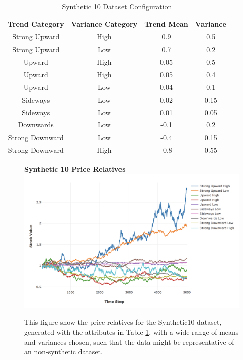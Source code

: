 \documentclass[a4paper,11pt,oneside]{article}
\theoremstyle{plain}
\theoremstyle{definition}
\begin{document}
	\begin{table}[H]
		\centering
		\small
		\begin{tabular}{|c|c|c|c|}
			\hline
			\textbf{Trend Category} &\textbf{Variance Category} & \textbf{Trend Mean} & \textbf{Variance}\\\hline	
			{Strong Upward} 		& {High} & {0.9} & {0.5} \\\hline
			{Strong Upward} 		& {Low} & {0.7} & {0.2} \\\hline
			{Upward} 					& {High} & {0.05} & {0.5} \\\hline
			{Upward} 					& {High} & {0.05} & {0.4} \\\hline
			{Upward} 					& {Low} & {0.04} & {0.1} \\\hline
			{Sideways} 					& {Low} & {0.02} & {0.15} \\\hline
			{Sideways}					& {Low} & {0.01} & {0.05} \\\hline
			{Downwards}				& {Low} & {-0.1} & {0.2} \\\hline
			{Strong Downward} 	& {Low} & {-0.4} & {0.15} \\\hline
			{Strong Downward}	& {High} & {-0.8} & {0.55} \\\hline
		\end{tabular}
		\newline\newline
		\caption{Synthetic 10 Dataset Configuration}\label{tab_synth10}
	\end{table}
	
	\begin{figure}[H]
		\centering
		\textbf{Synthetic 10 Price Relatives}
		\includegraphics[scale=0.35]{images/results/prices/synthetic10_prices.png} 
		\caption[Synthetic 10 Price Relatives]{This figure show the price relatives for the Synthetic10 dataset, generated with the attributes in Table \ref{tab_synth10}, with a wide range of means and variances chosen, such that the data might be representative of an non-synthetic dataset.}
		\label{figure-synthetic10_prices}
	\end{figure}
	
\end{document}
